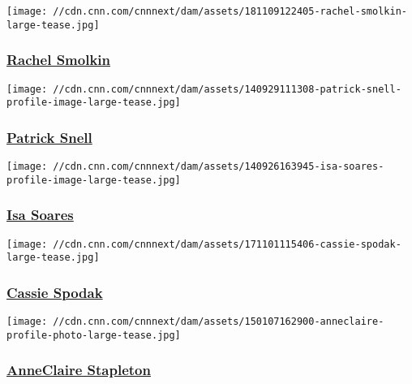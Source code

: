 \href{/profiles/rachel-smolkin}{}

\texttt{[image: //cdn.cnn.com/cnnnext/dam/assets/181109122405-rachel-smolkin-large-tease.jpg]}

\hypertarget{rachel-smolkin}{%
\subsubsection{\texorpdfstring{\href{/profiles/rachel-smolkin}{Rachel
Smolkin}}{Rachel Smolkin}}\label{rachel-smolkin}}

\href{/profiles/patrick-snell}{}

\texttt{[image: //cdn.cnn.com/cnnnext/dam/assets/140929111308-patrick-snell-profile-image-large-tease.jpg]}

\hypertarget{patrick-snell}{%
\subsubsection{\texorpdfstring{\href{/profiles/patrick-snell}{Patrick
Snell}}{Patrick Snell}}\label{patrick-snell}}

\href{/profiles/isa-soares}{}

\texttt{[image: //cdn.cnn.com/cnnnext/dam/assets/140926163945-isa-soares-profile-image-large-tease.jpg]}

\hypertarget{isa-soares}{%
\subsubsection{\texorpdfstring{\href{/profiles/isa-soares}{Isa
Soares}}{Isa Soares}}\label{isa-soares}}

\href{/profiles/cassie-spodak}{}

\texttt{[image: //cdn.cnn.com/cnnnext/dam/assets/171101115406-cassie-spodak-large-tease.jpg]}

\hypertarget{cassie-spodak}{%
\subsubsection{\texorpdfstring{\href{/profiles/cassie-spodak}{Cassie
Spodak}}{Cassie Spodak}}\label{cassie-spodak}}

\href{/profiles/anneclaire-stapleton}{}

\texttt{[image: //cdn.cnn.com/cnnnext/dam/assets/150107162900-anneclaire-profile-photo-large-tease.jpg]}

\hypertarget{anneclaire-stapleton}{%
\subsubsection{\texorpdfstring{\href{/profiles/anneclaire-stapleton}{AnneClaire
Stapleton}}{AnneClaire Stapleton}}\label{anneclaire-stapleton}}

